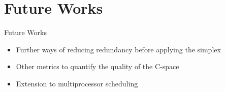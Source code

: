 \documentclass{beamer}
\begin{document}
\section{Future Works}

    \begin{frame}{Future Works}

    \begin{itemize}
        \item Further ways of reducing redundancy before applying the simplex
        \item Other metrics to quantify the quality of the C-space
        \item Extension to multiprocessor scheduling
    \end{itemize}

    \end{frame}



\end{document}
